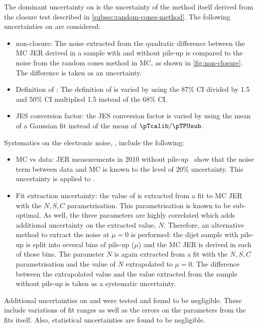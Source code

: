 The dominant uncertainty on \Npileup is the uncertainty of the method itself derived from the closure test described in \cref{subsec:random-cones-method}. The following uncertainties on \Npileup are considered:
\begin{itemize}
    \item \Npileup non-closure:
          The noise extracted from the quadratic difference between the MC JER derived in a sample with and without pile-up is compared to the noise from the random cones method in MC, as shown in \cref{fig:non-closure}. The difference is taken as an uncertainty.
    \item Definition of \sigmaRC:
          The definition of \sigmaRC is varied by using the 87\% CI divided by 1.5 and 50\% CI multiplied 1.5 instead of the 68\% CI.
    \item JES conversion factor: the JES conversion factor is varied by using the mean of a Gaussian fit instead of the mean of $\pTcalib / \pTPUsub$.
\end{itemize}

Systematics on the electronic noise, \Nmuzero, include the following:
\begin{itemize}
    \item MC vs data: JER measurements in 2010 without pile-up~\cite{PERF-2011-04} show that the noise term between data and MC is known to the level of 20\% uncertainty. This uncertainty is applied to \Nmuzero.
    \item Fit extraction uncertainty: the value of \Nmuzero is extracted from a fit to MC JER with the $N, S, C$ parametrisation. This parametrisation is known to be sub-optimal. As well, the three parameters are highly correlated which adds additional uncertainty on the extracted value, $N$. Therefore, an alternative method to extract the noise at $\mu=0$ is performed: the dijet sample with pile-up is split into several bins of pile-up ($\mu$) and the MC JER is derived in each of those bins. The parameter $N$ is again extracted from a fit with the $N, S, C$ parametrisation and the value of $N$ extrapolated to $\mu=0$. The difference between the extrapolated value and the value extracted from the sample without pile-up is taken as a systematic uncertainty.
\end{itemize}

Additional uncertainties on \Npileup and \Nmuzero were tested and found to be negligible. These include variations of fit ranges as well as the errors on the parameters from the fits itself. Also, statistical uncertainties are found to be negligible. 

